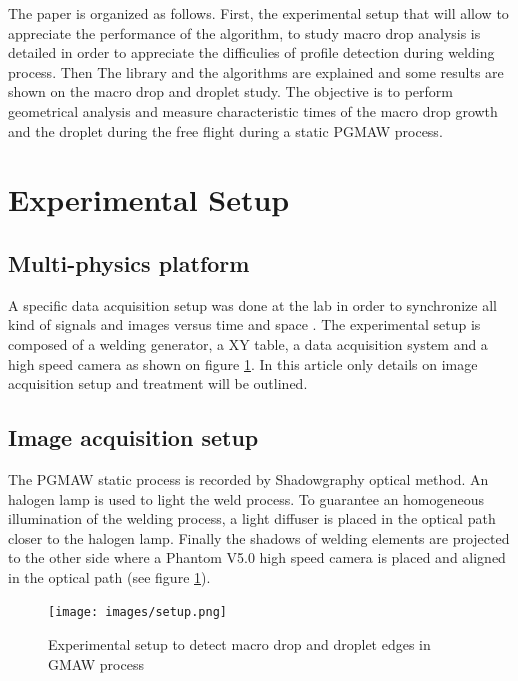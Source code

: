 \documentclass[12pt]{iopart}
\begin{document}
The paper is organized as follows. First, the experimental setup that will allow to appreciate the performance of the algorithm,
 to study macro drop analysis is detailed in order to appreciate the difficulies of profile detection
during welding process. 
Then The library and the algorithms are explained and some results are shown on the macro drop and droplet study.
The objective  is to perform geometrical analysis and measure characteristic
times of the macro drop growth and the droplet during the free flight 
during  a static PGMAW process. 


\section{Experimental Setup}
\label{experimental_setup}

\subsection{Multi-physics platform}
\label{multi_physics_platform}


A specific data acquisition setup was done at the lab in order to
synchronize all kind of signals and images versus time and space \cite{ChapuisThesis}.
The experimental setup is composed of a welding generator, a XY table, a data acquisition
system and a high speed camera as shown on figure \ref{schema-montage-experimental-GMAW}.
In this article only details on image acquisition setup and treatment will be outlined.



\subsection{ Image acquisition setup}
\label{ image_acquisition_setup}

The PGMAW static process is recorded by Shadowgraphy optical method. 
An halogen lamp is used to light the weld process. To guarantee an homogeneous
illumination of the welding process, a light diffuser is placed
in the optical path closer to the halogen lamp. 
Finally the shadows of welding elements are projected to the other side where
 a Phantom V5.0 high speed camera is placed and aligned in
 the optical path (see figure \ref{schema-montage-experimental-GMAW}). 

\begin{figure}
\begin{center}
\texttt{[image: images/setup.png]}
\caption{{\small Experimental setup to detect macro drop and droplet edges in GMAW process}}
\label{schema-montage-experimental-GMAW}
\end{center}
\end{figure}
\end{document}
